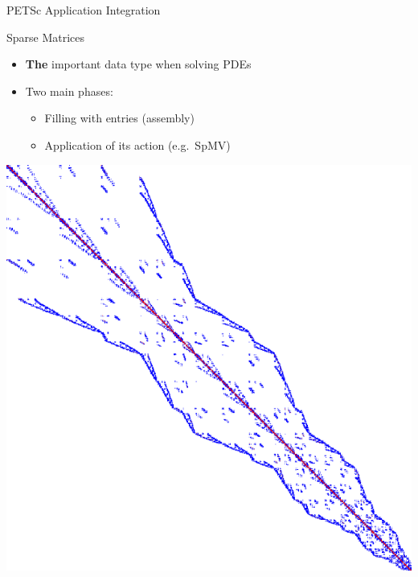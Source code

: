 
\begin{frame}[fragile]{PETSc Application Integration}

\begin{block}{Sparse Matrices}
\begin{itemize}
  \item \textbf{The} important data type when solving PDEs
  \item Two main phases: 
    \begin{itemize}
     \item Filling with entries (assembly)
     \item Application of its action (e.g.~SpMV)
    \end{itemize}
\end{itemize}
\end{block}

\begin{center}
\includegraphics[width=.5\textwidth]{figures/EllipRCMSquare}
\end{center}
\end{frame}



